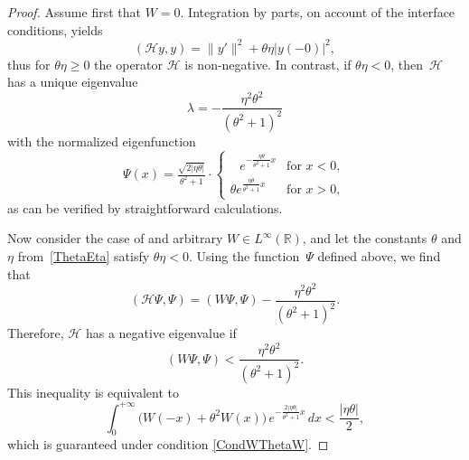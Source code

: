 \documentclass[10pt,a4paper]{amsart}
\newcommand{\Real}{\mathbb R}
\newcommand{\cH}{\mathcal{H}}
\begin{document}
\begin{proof}
Assume first that $W=0$. Integration by parts, on account of the interface conditions, yields
\begin{equation*}
    ( \cH y, y) = \|y'\|^2 + \theta\eta |y(-0)|^2,
\end{equation*}
thus for $\theta\eta\ge0$ the operator $\cH$ is non-negative. In contrast, if $\theta\eta<0$, then~$\cH$  has a unique eigenvalue
 \begin{equation}\label{EigenvalueH}
 \lambda =-\frac{\eta^2\theta^2}{(\theta^2+1)^2}
\end{equation}
with the normalized eigenfunction
\begin{equation*}
  \Psi(x)= \tfrac{\sqrt{2|\eta\theta|}}{\theta^2+1}\cdot
  \begin{cases}
   \phantom{A} e^{-\frac{\eta\theta}{\theta^2+1} x}& \text{for } x<0,\\
    \theta e^{\frac{\eta\theta}{\theta^2+1} x}& \text{for } x>0,
  \end{cases}
\end{equation*}
as can be verified by straightforward calculations.

Now consider the case of and arbitrary $W\in L^\infty(\Real)$, and let the constants $\theta$ and $\eta$ from~\eqref{ThetaEta} satisfy $\theta\eta<0$. Using the function~$\Psi$ defined above, we find that
  \begin{equation*}
    (\cH\Psi,\Psi)=(W\Psi,\Psi)-
    \frac{\eta^2\theta^2}{(\theta^2+1)^2}.
  \end{equation*}
Therefore, $\cH$ has a negative eigenvalue if
\begin{equation*}
 (W\Psi,\Psi)<\frac{\eta^2\theta^2}{(\theta^2+1)^2}.
\end{equation*}
This inequality is equivalent to
\begin{equation*}
  \int_0^{+\infty}\big(W(-x)+\theta^2 W(x)\big)\,e^{-\frac{2|\eta\theta|}{\theta^2+1} x}\,dx<\frac{|\eta\theta|}{2},
\end{equation*}
which is guaranteed under condition \eqref{CondWThetaW}.
\end{proof}	
\end{document}
